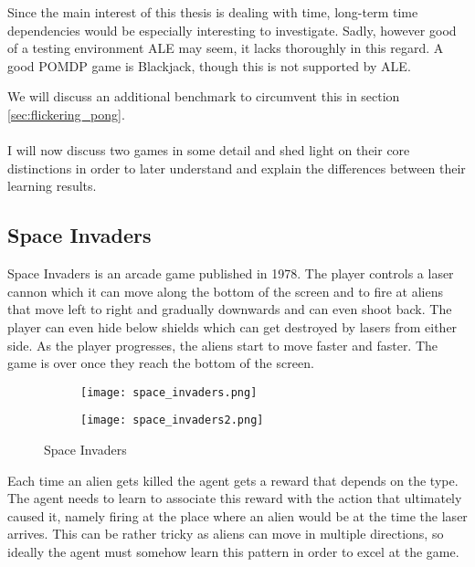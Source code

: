 Since the main interest of this thesis
is dealing with time,
long-term time dependencies would be especially interesting to investigate.
Sadly, however good of a testing environment ALE may seem,
it lacks thoroughly in this regard.
A good POMDP game is Blackjack,
though this is not supported by ALE.

We will discuss an additional benchmark
to circumvent this in section
\ref{sec:flickering_pong}.

\paragraph{}
I will now discuss two games in some detail
and shed light on their core distinctions
in order to later understand and explain
the differences between their learning results.

\subsection{Space Invaders}
\label{sub:space_invaders}
Space Invaders is an arcade game published in 1978.
The player controls a laser cannon
which it can move along the bottom of the screen
and to fire at aliens that move left to right and gradually downwards
and can even shoot back.
The player can even hide below shields
which can get destroyed by lasers from either side.
As the player progresses,
the aliens start to move faster and faster.
The game is over
once they reach the bottom of the screen.

\begin{figure}[htpb]
  \centering
  \begin{subfigure}[t]{.49\textwidth}
    \texttt{[image: space\_invaders.png]}
  \end{subfigure}
  \begin{subfigure}[t]{.49\textwidth}
    \texttt{[image: space\_invaders2.png]}
  \end{subfigure}
  \caption{Space Invaders}
  \label{fig:space_invaders}
\end{figure}

Each time an alien gets killed the agent gets a reward
that depends on the type.
The agent needs to learn to associate this reward
with the action that ultimately caused it,
namely firing at the place where an alien would be
at the time the laser arrives.
This can be rather tricky as aliens
can move in multiple directions,
so ideally the agent must somehow learn this pattern
in order to excel at the game.

